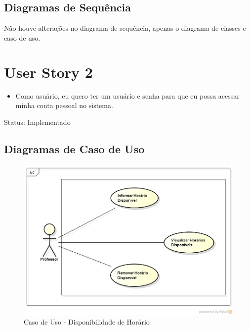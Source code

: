 \documentclass{abnt}
\begin{document}
		
		\subsection{Diagramas de Sequência}
		
		Não houve alterações no diagrama de sequência, apenas o diagrama de classes e caso de uso.
		
	
	\clearpage	
	\section{User Story 2}

		\begin{itemize}
			\item Como usuário, eu quero ter um usuário e senha para que eu possa acessar minha conta pessoal no sistema.
		\end{itemize}
		
		Status: Implementado
			
		\subsection{Diagramas de Caso de Uso}
		\begin{figure}[h]
			\begin{center}
				 \includegraphics[width=450px]{CasoUsoDisponibilidadeHorario}
				 \caption{Caso de Uso - Disponibilidade de Horário}
				 \label{fig:CasoUsoDisponibilidadeHorario}
			\end{center}
		\end{figure}
		
\end{document}
